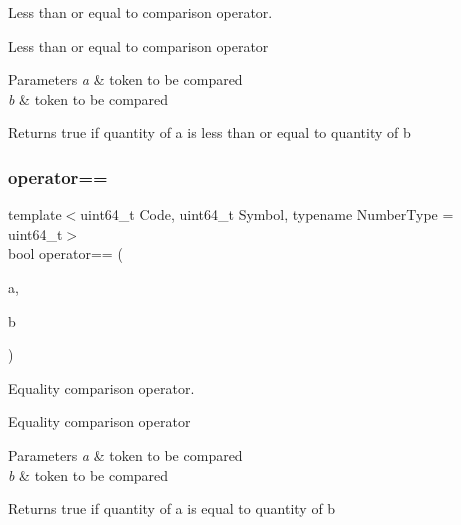 Less than or equal to comparison operator. 

Less than or equal to comparison operator 
\begin{DoxyParams}{Parameters}
{\em a} & token to be compared \\
\hline
{\em b} & token to be compared \\
\hline
\end{DoxyParams}
\begin{DoxyReturn}{Returns}
true if quantity of a is less than or equal to quantity of b 
\end{DoxyReturn}
\mbox{\label{classaacio_1_1token_ac4ae7b7680fa4bd2c09be5c29571dd91}} 
\subsubsection{\texorpdfstring{operator==}{operator==}}
{\footnotesize\ttfamily template$<$uint64\+\_\+t Code, uint64\+\_\+t Symbol, typename Number\+Type  = uint64\+\_\+t$>$ \\
bool operator== (\begin{DoxyParamCaption}\item[{const \mbox{\hyperlink{classaacio_1_1token}{token}}$<$ Code, Symbol, Number\+Type $>$ \&}]{a,  }\item[{const \mbox{\hyperlink{classaacio_1_1token}{token}}$<$ Code, Symbol, Number\+Type $>$ \&}]{b }\end{DoxyParamCaption})\hspace{0.3cm}{\ttfamily [friend]}}



Equality comparison operator. 

Equality comparison operator 
\begin{DoxyParams}{Parameters}
{\em a} & token to be compared \\
\hline
{\em b} & token to be compared \\
\hline
\end{DoxyParams}
\begin{DoxyReturn}{Returns}
true if quantity of a is equal to quantity of b 
\end{DoxyReturn}
\mbox{\label{classaacio_1_1token_a8b91c489658673e83721c460cb922df5}} 
